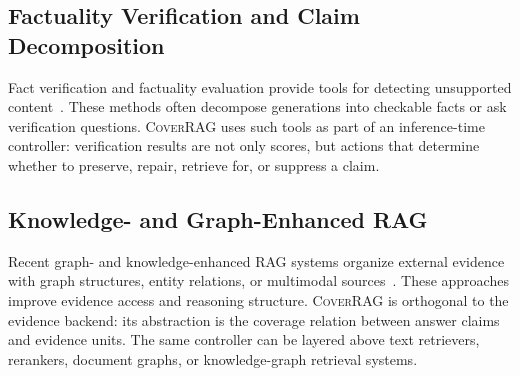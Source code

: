 \subsection{Factuality Verification and Claim Decomposition}

Fact verification and factuality evaluation provide tools for detecting unsupported content~\cite{thorne2018fever,min2023factscore,manakul2023selfcheckgpt,dhuliawala2024chain}. These methods often decompose generations into checkable facts or ask verification questions. \textsc{CoverRAG} uses such tools as part of an inference-time controller: verification results are not only scores, but actions that determine whether to preserve, repair, retrieve for, or suppress a claim.

\subsection{Knowledge- and Graph-Enhanced RAG}

Recent graph- and knowledge-enhanced RAG systems organize external evidence with graph structures, entity relations, or multimodal sources~\cite{edge2024local,guo2024lightrag,wang2024knowledge,zhao2024kg,chen2022murag}. These approaches improve evidence access and reasoning structure. \textsc{CoverRAG} is orthogonal to the evidence backend: its abstraction is the coverage relation between answer claims and evidence units. The same controller can be layered above text retrievers, rerankers, document graphs, or knowledge-graph retrieval systems.


